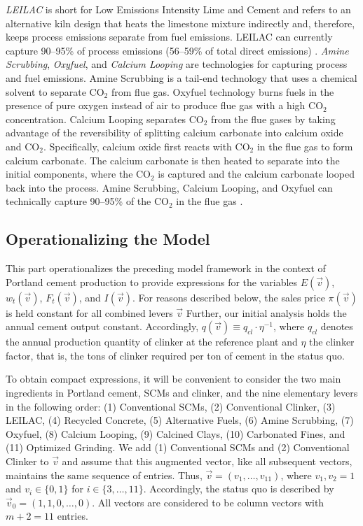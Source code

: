 \documentclass[12pt, a4paper]{article} %
\begin{document}
\emph{LEILAC} is short for Low Emissions Intensity Lime and Cement and refers to an alternative kiln design that heats the limestone mixture indirectly and, therefore, keeps process emissions separate from fuel emissions. LEILAC can currently capture 90--95\% of process emissions (56--59\% of total direct emissions) \citep{leilac2020low}. \emph{Amine Scrubbing}, \emph{Oxyfuel}, and \emph{Calcium Looping} are technologies for capturing process and fuel emissions. Amine Scrubbing is a tail-end technology that uses a chemical solvent to separate CO$_2$ from flue gas. Oxyfuel technology burns fuels in the presence of pure oxygen instead of air to produce flue gas with a high CO$_2$ concentration. Calcium Looping separates CO$_2$ from the flue gases by taking advantage of the reversibility of splitting calcium carbonate into calcium oxide and CO$_2$. Specifically, calcium oxide first reacts with CO$_2$ in the flue gas to form calcium carbonate. The calcium carbonate is then heated to separate into the initial components, where the CO$_2$ is captured and the calcium carbonate looped back into the process. Amine Scrubbing, Calcium Looping, and Oxyfuel can technically capture 90--95\% of the CO$_2$ in the flue gas \citep{ecra2022state, rochelle2009amine,iea2018technology,gcca2022calcium}.


\subsection*{Operationalizing the Model}

This part operationalizes the preceding model framework in the context of Portland cement production to provide expressions for the variables $E(\vec{v})$, $w_t(\vec{v})$, $F_t(\vec{v})$, and $I(\vec{v})$. For reasons described below, the sales price $\pi(\vec{v})$ is held constant for all combined levers $\vec{v}$  Further, our initial analysis holds the annual cement output constant. Accordingly, $q(\vec{v}) \equiv q_{cl} \cdot \eta^{-1}$, where $q_{cl}$ denotes the annual production quantity of clinker at the reference plant and $\eta$ the clinker factor, that is, the tons of clinker required per ton of cement in the status quo.

To obtain compact expressions, it will be convenient to consider the two main ingredients in Portland cement, SCMs and clinker, and the nine elementary levers in the following order: (1) Conventional SCMs, (2) Conventional Clinker, (3) LEILAC, (4) Recycled Concrete, (5) Alternative Fuels, (6) Amine Scrubbing, (7) Oxyfuel, (8) Calcium Looping, (9) Calcined Clays, (10) Carbonated Fines, and (11) Optimized Grinding. We add (1) Conventional SCMs and (2) Conventional Clinker to $\vec{v}$ and assume that this augmented vector, like all subsequent vectors, maintains the same sequence of entries. Thus, $\vec{v} = (v_1, \ldots, v_{11})$, where $v_1, v_2 = 1$ and $v_i \in \{0,1\}$ for $i \in \{3,\ldots,11\}$. Accordingly, the status quo is described by $\vec{v}_0 = (1, 1, 0, \ldots, 0)$. All vectors are considered to be column vectors with $m+2 = 11$ entries.
\end{document}
